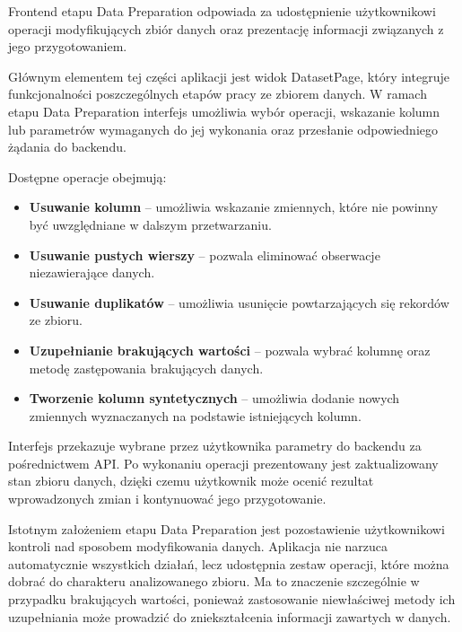 \documentclass[12pt]{book}
\begin{document}
Frontend etapu Data Preparation odpowiada za udostępnienie użytkownikowi
operacji modyfikujących zbiór danych oraz prezentację informacji związanych
z jego przygotowaniem.

Głównym elementem tej części aplikacji jest widok DatasetPage,
który integruje funkcjonalności poszczególnych etapów pracy ze zbiorem danych.
W ramach etapu Data Preparation interfejs umożliwia wybór operacji, wskazanie kolumn
lub parametrów wymaganych do jej wykonania oraz przesłanie odpowiedniego żądania do backendu.

Dostępne operacje obejmują:

\begin{itemize}

    \item \textbf{Usuwanie kolumn} -- umożliwia wskazanie zmiennych,
    które nie powinny być uwzględniane w dalszym przetwarzaniu.

    \item \textbf{Usuwanie pustych wierszy} -- pozwala eliminować
    obserwacje niezawierające danych.

    \item \textbf{Usuwanie duplikatów} -- umożliwia usunięcie
    powtarzających się rekordów ze zbioru.

    \item \textbf{Uzupełnianie brakujących wartości} -- pozwala wybrać
    kolumnę oraz metodę zastępowania brakujących danych.

    \item \textbf{Tworzenie kolumn syntetycznych} -- umożliwia dodanie
    nowych zmiennych wyznaczanych na podstawie istniejących kolumn.

\end{itemize}

Interfejs przekazuje wybrane przez użytkownika parametry do backendu za pośrednictwem API.
Po wykonaniu operacji prezentowany jest zaktualizowany stan zbioru danych,
dzięki czemu użytkownik może ocenić rezultat wprowadzonych zmian i kontynuować
jego przygotowanie.

Istotnym założeniem etapu Data Preparation jest pozostawienie użytkownikowi
kontroli nad sposobem modyfikowania danych. Aplikacja nie narzuca automatycznie
wszystkich działań, lecz udostępnia zestaw operacji, które można dobrać do charakteru
analizowanego zbioru. Ma to znaczenie szczególnie w przypadku brakujących wartości,
ponieważ zastosowanie niewłaściwej metody ich uzupełniania może prowadzić
do zniekształcenia informacji zawartych w danych.
\end{document}
